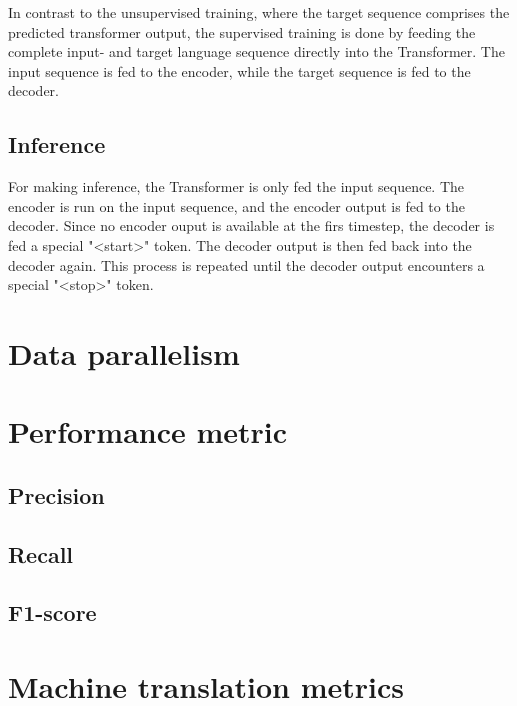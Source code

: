 In contrast to the unsupervised training, where the target sequence comprises the predicted transformer output, the supervised training is done by feeding the complete input- and target language sequence directly into the Transformer. The input sequence is fed to the encoder, while the target sequence is fed to the decoder.

\subsection{Inference}
\label{sec:transformer-inference}
For making inference, the Transformer is only fed the input sequence. The encoder is run on the input sequence, and the encoder output is fed to the decoder. Since no encoder ouput is available at the firs timestep, the decoder is fed a special "<start>" token. The decoder output is then fed back into the decoder again. This process is repeated until the decoder output encounters a special "<stop>" token.


\section{Data parallelism}
\label{sec:data-parallelism}

\section{Performance metric}
\label{sec:performance-metric}

\subsection{Precision}
\label{sec:precision}

\subsection{Recall}
\label{sec:recall}

\subsection{F1-score}
\label{sec:f1-score}

\section{Machine translation metrics}
\label{sec:machine-translation-metrics}

